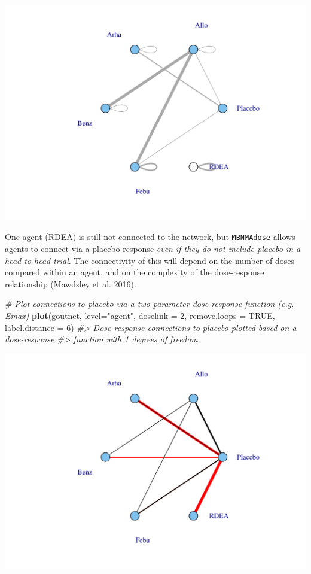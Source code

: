 \documentclass[]{article}
\newenvironment{Shaded}{\begin{snugshade}}{\end{snugshade}}
\newcommand{\CommentTok}[1]{\textcolor[rgb]{0.56,0.35,0.01}{\textit{#1}}}
\newcommand{\DataTypeTok}[1]{\textcolor[rgb]{0.13,0.29,0.53}{#1}}
\newcommand{\DecValTok}[1]{\textcolor[rgb]{0.00,0.00,0.81}{#1}}
\newcommand{\KeywordTok}[1]{\textcolor[rgb]{0.13,0.29,0.53}{\textbf{#1}}}
\newcommand{\NormalTok}[1]{#1}
\newcommand{\OtherTok}[1]{\textcolor[rgb]{0.56,0.35,0.01}{#1}}
\newcommand{\StringTok}[1]{\textcolor[rgb]{0.31,0.60,0.02}{#1}}
\begin{document}
\includegraphics{mbnmadose_files/figure-latex/unnamed-chunk-9-1.pdf}

One agent (RDEA) is still not connected to the network, but
\texttt{MBNMAdose} allows agents to connect via a placebo response
\emph{even if they do not include placebo in a head-to-head trial}. The
connectivity of this will depend on the number of doses compared within
an agent, and on the complexity of the dose-response relationship
(Mawdsley et al. 2016).

\begin{Shaded}
\begin{Highlighting}[]
\CommentTok{# Plot connections to placebo via a two-parameter dose-response function (e.g. Emax)}
\KeywordTok{plot}\NormalTok{(goutnet, }\DataTypeTok{level=}\StringTok{"agent"}\NormalTok{, }\DataTypeTok{doselink =} \DecValTok{2}\NormalTok{, }\DataTypeTok{remove.loops =} \OtherTok{TRUE}\NormalTok{, }\DataTypeTok{label.distance =} \DecValTok{6}\NormalTok{)}
\CommentTok{#> Dose-response connections to placebo plotted based on a dose-response}
\CommentTok{#>                    function with 1 degrees of freedom}
\end{Highlighting}
\end{Shaded}

\includegraphics{mbnmadose_files/figure-latex/unnamed-chunk-10-1.pdf}
\end{document}

